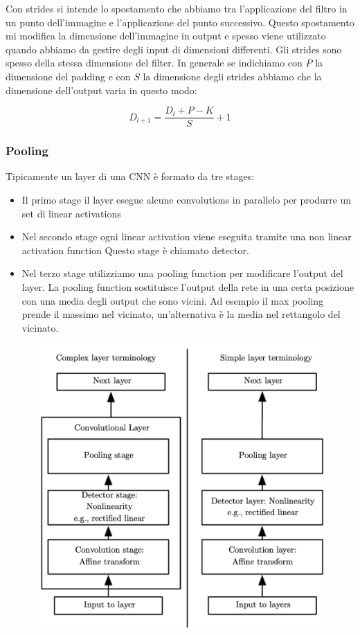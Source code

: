 \documentclass[14pt]{extreport}
\begin{document}
Con strides si intende lo spostamento che abbiamo tra l'applicazione del filtro in un punto dell'immagine e l'applicazione del punto successivo.
Questo spostamento mi modifica la dimensione dell'immagine in output e spesso viene utilizzato quando abbiamo da gestire degli input di dimensioni
differenti. Gli strides sono spesso della stessa dimensione del filter. In generale se indichiamo con $P$ la dimensione del padding e con $S$ la
dimensione degli strides abbiamo che la dimensione dell'output varia in questo modo:

$$D_{l+1} = \frac{D_l+P-K}{S} + 1$$

\subsubsection{Pooling}

Tipicamente un layer di una CNN è formato da tre stages:
\begin{itemize}
	\item Il primo stage il layer esegue alcune convolutions in parallelo per produrre un set di linear activations
	\item Nel secondo stage ogni linear activation viene eseguita tramite una non linear activation function Questo stage è chiamato detector.
	\item Nel terzo stage utilizziamo una pooling function per modificare l'output del layer. La pooling function sostituisce l'output della rete in
	      una certa posizione con una media degli output che sono vicini. Ad esempio il max pooling prende il massimo nel vicinato, un'alternativa è
	      la media nel rettangolo del vicinato.
\end{itemize}

\begin{figure}[H]
	\centering
	\includegraphics[width=0.7\linewidth]{413.jpeg}
\end{figure}
\end{document}
